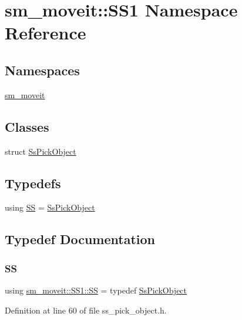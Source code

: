 \hypertarget{namespacesm__moveit_1_1SS1}{}\section{sm\+\_\+moveit\+:\+:S\+S1 Namespace Reference}
\label{namespacesm__moveit_1_1SS1}
\subsection*{Namespaces}
\begin{DoxyCompactItemize}
\item 
 \hyperlink{namespacesm__moveit_1_1SS1_1_1sm__moveit}{sm\+\_\+moveit}
\end{DoxyCompactItemize}
\subsection*{Classes}
\begin{DoxyCompactItemize}
\item 
struct \hyperlink{structsm__moveit_1_1SS1_1_1SsPickObject}{Ss\+Pick\+Object}
\end{DoxyCompactItemize}
\subsection*{Typedefs}
\begin{DoxyCompactItemize}
\item 
using \hyperlink{namespacesm__moveit_1_1SS1_a82919e558782e44b5fbfed9a58db5203}{SS} = \hyperlink{structsm__moveit_1_1SS1_1_1SsPickObject}{Ss\+Pick\+Object}
\end{DoxyCompactItemize}


\subsection{Typedef Documentation}
\mbox{\label{namespacesm__moveit_1_1SS1_a82919e558782e44b5fbfed9a58db5203}} 
\subsubsection{\texorpdfstring{SS}{SS}}
{\footnotesize\ttfamily using \hyperlink{namespacesm__moveit_1_1SS1_a82919e558782e44b5fbfed9a58db5203}{sm\+\_\+moveit\+::\+S\+S1\+::\+SS} = typedef \hyperlink{structsm__moveit_1_1SS1_1_1SsPickObject}{Ss\+Pick\+Object}}



Definition at line 60 of file ss\+\_\+pick\+\_\+object.\+h.


